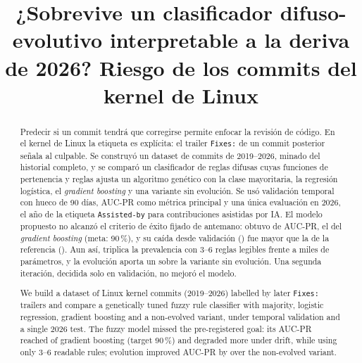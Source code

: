 \documentclass[conference,letterpaper]{IEEEtran}
\begin{document}
\title{¿Sobrevive un clasificador difuso-evolutivo interpretable a la deriva de 2026? Riesgo de los commits del kernel de Linux}

\author{
}

\maketitle

\begin{abstract}
Predecir si un commit tendrá que corregirse permite enfocar la revisión de código. En el kernel de Linux la etiqueta es explícita: el trailer \texttt{Fixes:} de un commit posterior señala al culpable. Se construyó un dataset de \cifCommits{} commits de 2019--2026, minado del historial completo, y se comparó un clasificador de reglas difusas cuyas funciones de pertenencia y reglas ajusta un algoritmo genético con la clase mayoritaria, la regresión logística, el \emph{gradient boosting} y una variante sin evolución. Se usó validación temporal con hueco de 90 días, AUC-PR como métrica principal y una única evaluación en 2026, el año de la etiqueta \texttt{Assisted-by} para contribuciones asistidas por IA. El modelo propuesto no alcanzó el criterio de éxito fijado de antemano: obtuvo \cifTestFE{} de AUC-PR, el \cifCuno{} del \emph{gradient boosting} (meta: 90\,\%), y su caída desde validación (\cifCaidaFE{}) fue mayor que la de la referencia (\cifCaidaGB{}). Aun así, triplica la prevalencia con 3--6 reglas legibles frente a miles de parámetros, y la evolución aporta un \cifAporteEvolPrueba{} sobre la variante sin evolución. Una segunda iteración, decidida solo en validación, no mejoró el modelo.
\end{abstract}

\begingroup\renewcommand{\abstractname}{Abstract}
\begin{abstract}
We build a dataset of \cifCommits{} Linux kernel commits (2019--2026) labelled by later \texttt{Fixes:} trailers and compare a genetically tuned fuzzy rule classifier with majority, logistic regression, gradient boosting and a non-evolved variant, under temporal validation and a single 2026 test. The fuzzy model missed the pre-registered goal: its AUC-PR reached \cifCuno{} of gradient boosting (target 90\,\%) and degraded more under drift, while using only 3--6 readable rules; evolution improved AUC-PR by \cifAporteEvolPrueba{} over the non-evolved variant.
\end{abstract}\endgroup
\end{document}
